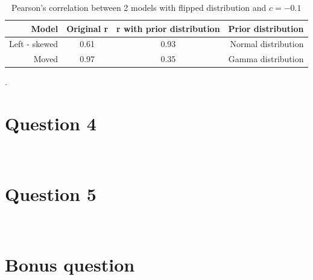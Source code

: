 \documentclass[11pt,a4paper,oneside]{article}
\begin{document}
\begin{table}[ht]
\centering
\begin{tabular}{rccr}
  \hline
 Model & Original r & r with prior distribution & Prior distribution\\ 
  \hline
    Left - skewed & 0.61 & 0.93 & Normal distribution\\ 
    Moved & 0.97 & 0.35 & Gamma distribution\\ 
   \hline
\end{tabular}
\caption{Pearson's correlation between 2 models with flipped distribution and $c = -0.1$}.
\label{question_3_flipped}
\end{table}

\section{Question 4}
\label{Q4}
\textit{}\\

\section{Question 5}
\label{Q5}
\textit{}\\

\section{Bonus question}
\label{bonus}
\textit{}\\

\clearpage 
\printbibliography
\end{document}
